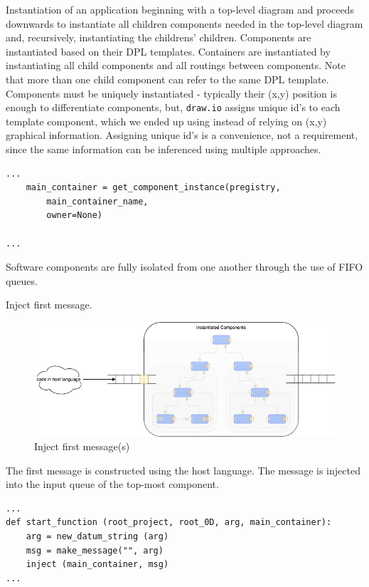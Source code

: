 \documentclass[10pt,anonymous,review]{acmart}
\begin{document}
  Instantiation\cite{run} of an application beginning with a top-level diagram
and proceeds downwards to instantiate all children components needed in
the top-level diagram and, recursively, instantiating the childrens'
children. Components are instantiated based on their DPL templates.
Containers are instantiated by instantiating all child components and
all routings between components. Note that more than one child component
can refer to the same DPL template. Components must be uniquely
instantiated - typically their (x,y) position is enough to differentiate
components, but, \texttt{draw.io} assigns unique
id's to each template component, which we ended up using instead of
relying on (x,y) graphical information. Assigning unique id's is a
convenience, not a requirement, since the same information can be inferenced 
using multiple approaches.


\begin{verbatim}
...
    main_container = get_component_instance(pregistry,
        main_container_name,
        owner=None)

...
\end{verbatim}

Software components are fully isolated from one another through the use
of FIFO queues.

\item Inject first message.
  \begin{figure}[h]
    \centering
    \includegraphics[width=0.8\linewidth]{./media/image5.png}
    \caption{Inject first message(s)}
    \label{fig:inject_first_message}
  \end{figure}

The first message is constructed using the host language. The message is
injected\cite{main} into the input queue of the top-most component.

\begin{verbatim}
...
def start_function (root_project, root_0D, arg, main_container):
    arg = new_datum_string (arg)
    msg = make_message("", arg)
    inject (main_container, msg)
...
\end{verbatim}
  
\end{document}
